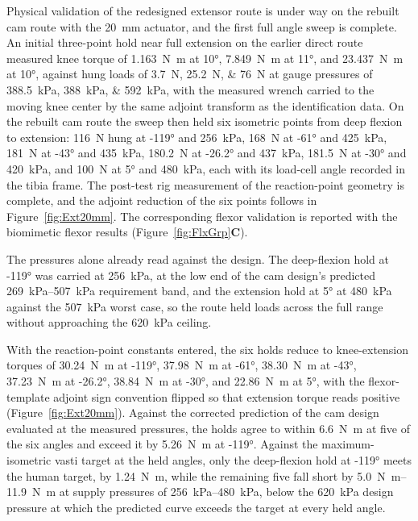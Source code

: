\documentclass[utf8]{FrontiersinHarvard} %
\begin{document}
Physical validation of the redesigned extensor route is under way on the rebuilt cam route with the \qty{20}{\mm} actuator, and the first full angle sweep is complete. An initial three-point hold near full extension on the earlier direct route measured knee torque of \qty{1.163}{\newton\meter} at \ang{10}, \qty{7.849}{\newton\meter} at \ang{11}, and \qty{23.437}{\newton\meter} at \ang{10}, against hung loads of \qtylist{3.7;25.2;76}{\newton} at gauge pressures of \qtylist{388.5;388;592}{\kPa}, with the measured wrench carried to the moving knee center by the same adjoint transform as the identification data. On the rebuilt cam route the sweep then held six isometric points from deep flexion to extension: \qty{116}{\newton} hung at \ang{-119} and \qty{256}{\kPa}, \qty{168}{\newton} at \ang{-61} and \qty{425}{\kPa}, \qty{181}{\newton} at \ang{-43} and \qty{435}{\kPa}, \qty{180.2}{\newton} at \ang{-26.2} and \qty{437}{\kPa}, \qty{181.5}{\newton} at \ang{-30} and \qty{420}{\kPa}, and \qty{100}{\newton} at \ang{5} and \qty{480}{\kPa}, each with its load-cell angle recorded in the tibia frame. The post-test rig measurement of the reaction-point geometry is complete, and the adjoint reduction of the six points follows in Figure~\ref{fig:Ext20mm}. The corresponding flexor validation is reported with the biomimetic flexor results (Figure~\ref{fig:FlxGrp}\textbf{C}).

The pressures alone already read against the design. The deep-flexion hold at \ang{-119} was carried at \qty{256}{\kPa}, at the low end of the cam design's predicted \qtyrange{269}{507}{\kPa} requirement band, and the extension hold at \ang{5} at \qty{480}{\kPa} against the \qty{507}{\kPa} worst case, so the route held loads across the full range without approaching the \qty{620}{\kPa} ceiling.

With the reaction-point constants entered, the six holds reduce to knee-extension torques of \qty{30.24}{\newton\meter} at \ang{-119}, \qty{37.98}{\newton\meter} at \ang{-61}, \qty{38.30}{\newton\meter} at \ang{-43}, \qty{37.23}{\newton\meter} at \ang{-26.2}, \qty{38.84}{\newton\meter} at \ang{-30}, and \qty{22.86}{\newton\meter} at \ang{5}, with the flexor-template adjoint sign convention flipped so that extension torque reads positive (Figure~\ref{fig:Ext20mm}). Against the corrected prediction of the cam design evaluated at the measured pressures, the holds agree to within \qty{6.6}{\newton\meter} at five of the six angles and exceed it by \qty{5.26}{\newton\meter} at \ang{-119}. Against the maximum-isometric vasti target at the held angles, only the deep-flexion hold at \ang{-119} meets the human target, by \qty{1.24}{\newton\meter}, while the remaining five fall short by \qtyrange{5.0}{11.9}{\newton\meter} at supply pressures of \qtyrange{256}{480}{\kPa}, below the \qty{620}{\kPa} design pressure at which the predicted curve exceeds the target at every held angle.
\end{document}
